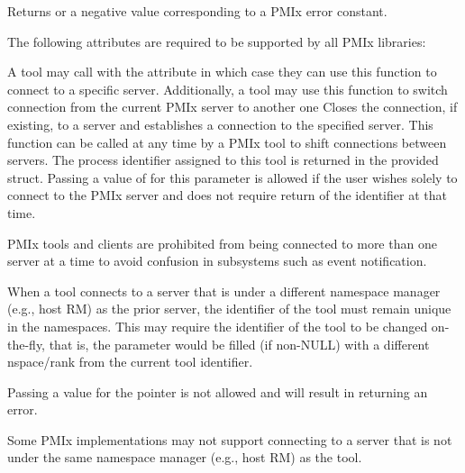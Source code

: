 Returns  or a negative value corresponding to a PMIx error constant.

\reqattrstart
The following attributes are required to be supported by all \ac{PMIx} libraries:


\reqattrend

\descr

A tool may call  with the  attribute in which case they can use this function to connect to a specific server.
Additionally, a tool may use this function to switch connection from the current \ac{PMIx} server to another one
Closes the connection, if existing, to a server and establishes a connection to the specified server.
This function can be called at any time by a \ac{PMIx} tool to shift connections between servers.
The process identifier assigned to this tool is returned in the provided  struct.
Passing a value of  for this parameter is allowed if the user wishes solely to connect to the \ac{PMIx} server and does not require return of the identifier at that time.

\adviceimplstart
\ac{PMIx} tools and clients are prohibited from being connected to more than one server at a time to avoid confusion in subsystems such as event notification.

When a tool connects to a server that is under a different namespace manager (e.g., host \ac{RM}) as the prior server, the identifier of the tool must remain unique in the namespaces. This may require the identifier of the tool to be changed on-the-fly, that is, the  parameter would be filled (if non-NULL) with a different nspace/rank from the current tool identifier.
\adviceimplend

\adviceuserstart
Passing a  value for the  pointer is not allowed and will result in returning an error.

Some \ac{PMIx} implementations may not support connecting to a server that is not under the same namespace manager (e.g., host \ac{RM}) as the tool.
\adviceuserend


